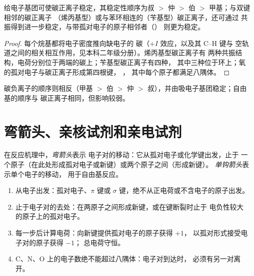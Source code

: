 \begin{proposition}[碳正离子的稳定性]\label{prop:b1:electronic-effects:carbocation-order}
给电子基团可使碳正离子稳定，其稳定性顺序为叔
$>$ 仲 $>$ 伯 $>$ 甲基；与双键相邻的碳正离子
（烯丙基型）或与苯环相连的（苄基型）碳正离子，还可通过
共振得到进一步稳定，与带孤对电子的原子相邻者（）
则更为稳定。
\end{proposition}

\begin{proof}
每个烷基都将电子密度推向缺电子的
碳（$+I$ 效应，以及其 C--H 键与
空轨道之间的相关相互作用，见本科二年级分册）。烯丙基型碳正离子有
两种共振结构，电荷分别位于两端的碳上；苄基型碳正离子有四种，
其中三种位于环上；氧的孤对电子与碳正离子形成第四根键，
，
其中每个原子都满足八隅体。
\end{proof}

碳负离子的顺序则相反（甲基 $>$ 伯 $>$ 仲
$>$ 叔），并由吸电子基团稳定；自由基的顺序与
碳正离子相同，但影响较弱。

\section{弯箭头、亲核试剂和亲电试剂}

\begin{definition}[弯箭头]\label{def:b1:electronic-effects:curly-arrow}
在反应机理中，\emph{弯箭头}表示
电子对的移动：它从孤对电子或化学键出发，止于
一个原子（在此处形成孤对电子或新键）或两个原子之间（形成新键）。
\emph{单钩箭头}表示单个电子的移动，
用于自由基反应。
\end{definition}

\begin{method}[画弯箭头]\label{met:b1:electronic-effects:curly-arrows}
\begin{enumerate}
  \item 从电子出发：孤对电子、$\pi$ 键或 $\sigma$
        键，绝不从正电荷或不含电子的原子出发。
  \item 止于电子对的去处：在两原子之间形成新键，或在键断裂时止于
        电负性较大的原子上的孤对电子。
  \item 每一步后计算电荷：向新键提供孤对电子的原子获得 $+1$，
        以孤对形式接受电子对的原子获得 $-1$；
        总电荷守恒。
  \item C、N、O 上的电子数绝不能超过八隅体：电子对到达时，
        必须有另一对离开。
\end{enumerate}
\end{method}

